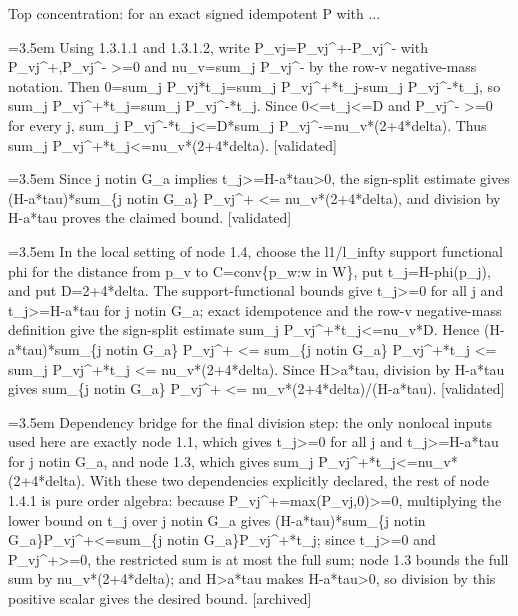 \documentclass{article}
\newcommand{\step}[1]{\par\noindent\hangindent=3.5em\hangafter=1%
  \makebox[3.5em][l]{\textbf{#1.}}}
\newcommand{\steptag}[1]{\hfill{\small\textsf{[#1]}}}
\begin{document}
\begin{proofbox}{Top concentration: for an exact signed idempotent P with ...}
\step{1.3.1.3} Using 1.3.1.1 and 1.3.1.2, write P\_vj=P\_vj\textasciicircum{}+-P\_vj\textasciicircum{}- with P\_vj\textasciicircum{}+,P\_vj\textasciicircum{}- >=0 and nu\_v=sum\_j P\_vj\textasciicircum{}- by the row-v negative-mass notation. Then 0=sum\_j P\_vj*t\_j=sum\_j P\_vj\textasciicircum{}+*t\_j-sum\_j P\_vj\textasciicircum{}-*t\_j, so sum\_j P\_vj\textasciicircum{}+*t\_j=sum\_j P\_vj\textasciicircum{}-*t\_j. Since 0<=t\_j<=D and P\_vj\textasciicircum{}- >=0 for every j, sum\_j P\_vj\textasciicircum{}-*t\_j<=D*sum\_j P\_vj\textasciicircum{}-=nu\_v*(2+4*delta). Thus sum\_j P\_vj\textasciicircum{}+*t\_j<=nu\_v*(2+4*delta). \steptag{validated} \\[4pt]
\step{1.4} Since j notin G\_a implies t\_j>=H-a*tau>0, the sign-split estimate gives (H-a*tau)*sum\_\{j notin G\_a\} P\_vj\textasciicircum{}+ <= nu\_v*(2+4*delta), and division by H-a*tau proves the claimed bound. \steptag{validated} \\[6pt]
\step{1.4.1} In the local setting of node 1.4, choose the l1/l\_infty support functional phi for the distance from p\_v to C=conv\{p\_w:w in W\}, put t\_j=H-phi(p\_j), and put D=2+4*delta. The support-functional bounds give t\_j>=0 for all j and t\_j>=H-a*tau for j notin G\_a; exact idempotence and the row-v negative-mass definition give the sign-split estimate sum\_j P\_vj\textasciicircum{}+*t\_j<=nu\_v*D. Hence (H-a*tau)*sum\_\{j notin G\_a\} P\_vj\textasciicircum{}+ <= sum\_\{j notin G\_a\} P\_vj\textasciicircum{}+*t\_j <= sum\_j P\_vj\textasciicircum{}+*t\_j <= nu\_v*(2+4*delta). Since H>a*tau, division by H-a*tau gives sum\_\{j notin G\_a\} P\_vj\textasciicircum{}+ <= nu\_v*(2+4*delta)/(H-a*tau). \steptag{validated} \\[6pt]
\step{1.4.1.1} Dependency bridge for the final division step: the only nonlocal inputs used here are exactly node 1.1, which gives t\_j>=0 for all j and t\_j>=H-a*tau for j notin G\_a, and node 1.3, which gives sum\_j P\_vj\textasciicircum{}+*t\_j<=nu\_v*(2+4*delta). With these two dependencies explicitly declared, the rest of node 1.4.1 is pure order algebra: because P\_vj\textasciicircum{}+=max(P\_vj,0)>=0, multiplying the lower bound on t\_j over j notin G\_a gives (H-a*tau)*sum\_\{j notin G\_a\}P\_vj\textasciicircum{}+<=sum\_\{j notin G\_a\}P\_vj\textasciicircum{}+*t\_j; since t\_j>=0 and P\_vj\textasciicircum{}+>=0, the restricted sum is at most the full sum; node 1.3 bounds the full sum by nu\_v*(2+4*delta); and H>a*tau makes H-a*tau>0, so division by this positive scalar gives the desired bound. \steptag{archived} \\[4pt]

\end{proofbox}
\end{document}
